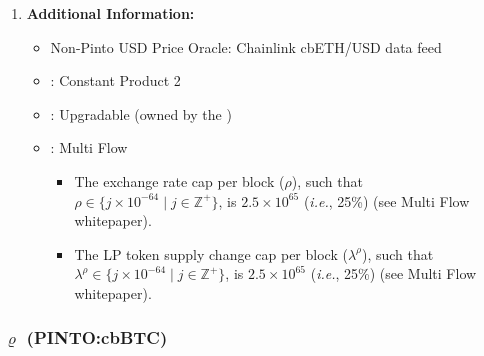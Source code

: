 \documentclass[class=article, crop=false]{standalone}
\begin{document}
\begin{enumerate}
    \item \textbf{Additional Information:}
        \begin{itemize}
            \item Non-Pinto USD Price Oracle: Chainlink cbETH/USD data feed
            \item {}: Constant Product 2
            \item {}: Upgradable  (owned by the )
            \item {}: Multi Flow
                \begin{itemize}
                    \item The exchange rate cap per block ($\rho$), such that $\rho \in \{j \times 10^{-64} \mid j \in \mathbb{Z}^{+} \}$, is $2.5 \times 10^{65}$ (\textit{i.e.}, 25\%) (see Multi Flow whitepaper).
                    \item The LP token supply change cap per block ($\lambda^{\rho}$), such that $\lambda^{\rho} \in \{j \times 10^{-64} \mid j \in \mathbb{Z}^{+} \}$, is $2.5 \times 10^{65}$ (\textit{i.e.}, 25\%) (see Multi Flow whitepaper).
                \end{itemize}
        \end{itemize}

\end{enumerate}


\subsubsection{$\varrho$ (PINTO:cbBTC)}
\end{document}
